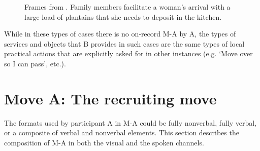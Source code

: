 \documentclass[output=paper]{langsci/langscibook}
\begin{document}
%
\begin{mdframednoverticalspace}[style=firstfoc]
\end{mdframednoverticalspace}
%
\begin{mdframednoverticalspace}[style=secondfoc]
\end{mdframednoverticalspace}

\begin{figure}
\caption{Frames from . Family members facilitate a woman's arrival with a large load of plantains that she needs to deposit in the kitchen.}


\label{fig:floyd:1}
\end{figure}

While in these types of cases there is no on-record M-A by A, the types of services and objects that B provides in such cases are the same types of local practical actions that are explicitly asked for in other instances (e.g. ‘Move over so I can pass’, etc.).

\section{Move A: The recruiting move}\label{sec:floyd:3}

The formats used by participant A in M-A could be fully nonverbal, fully verbal, or a composite of verbal and nonverbal elements. This section describes the composition of M-A in both the visual and the spoken channels.
\end{document}
